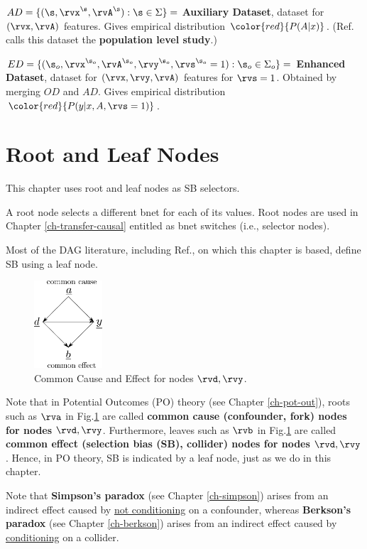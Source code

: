 $AD=\{(\s, \rvx^\s,\rvA^\s):\s\in\Sigma\}=$
{\bf Auxiliary Dataset}, dataset for $(\rvx, \rvA)$ features.
Gives empirical
distribution $\color{red}{P(A|x)}$.
(Ref.\cite{bare-sb-removal}
calls this dataset the
{\bf population level study}.)


$ED=\{({\s_o},\rvx^{\s_o}, \rvA^{\s_o}, \rvy^{\s_o},
\rvs^{\s_o}=1):{\s_o}\in\Sigma_o\}=$
{\bf Enhanced Dataset}, dataset for $(\rvx,\rvy, \rvA)$ features
for $\rvs=1$.
Obtained by merging $OD$ and $AD$.
Gives empirical
distribution $\color{red}{P(y|x, A, \rvs=1)}$.

\section{Root and Leaf Nodes}

This chapter uses root and leaf nodes
as SB selectors.

A root node selects a different bnet 
for each of its values.
Root nodes are used
in Chapter \ref{ch-transfer-causal}
entitled 
as bnet switches (i.e., selector nodes).


Most of the DAG literature,
including Ref.\cite{bare-sb-removal},
on which this chapter is based,
define SB using a leaf node.


\begin{figure}[h!]
\centering
\includegraphics[width=1in]
{sb-removal/common-cause-effect.png}
\caption{Common Cause
and Effect for
nodes $\rvd,\rvy$.}
\label{fig-common-cause-effect}
\end{figure}

Note
that in Potential
Outcomes (PO) theory
 (see Chapter \ref{ch-pot-out}),
roots such
as $\rva$ in
Fig.\ref{fig-common-cause-effect}
are called {\bf common cause
 (confounder, fork) nodes
for nodes $\rvd, \rvy$}.
Furthermore, leaves such as
$\rvb$ in
Fig.\ref{fig-common-cause-effect} are
called
{\bf common effect
(selection bias (SB), collider) nodes
for nodes $\rvd, \rvy$}.
Hence, in PO theory,
SB is indicated
by
a leaf node,
just as we do in this chapter.

Note that
{\bf Simpson's paradox} (see Chapter
\ref{ch-simpson}) arises from an indirect effect
caused by \ul{not conditioning}
on a confounder,
whereas
{\bf Berkson's paradox}
(see Chapter \ref{ch-berkson})
arises from an indirect effect
caused by \ul{conditioning}
on a collider.



